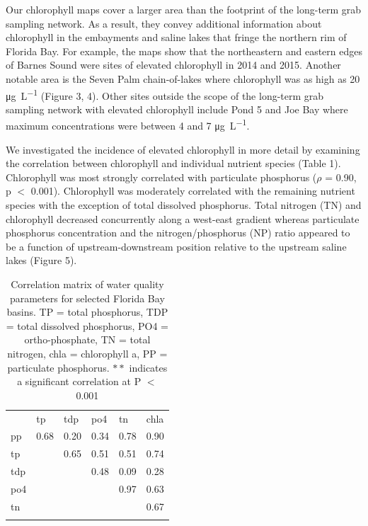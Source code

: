 Our chlorophyll maps cover a larger area than the footprint of the long-term grab sampling network. As a result, they convey additional information about chlorophyll in the embayments and saline lakes that fringe the northern rim of Florida Bay. For example, the maps show that the northeastern and eastern edges of Barnes Sound were sites of elevated chlorophyll in 2014 and 2015. Another notable area is the Seven Palm chain-of-lakes where chlorophyll was as high as 20 \si{\micro\gram\per\liter} (Figure 3, 4). Other sites outside the scope of the long-term grab sampling network with elevated chlorophyll include Pond 5 and Joe Bay where maximum concentrations were between 4 and 7 \si{\micro\gram\per\liter}. 

We investigated the incidence of elevated chlorophyll in more detail by examining the correlation between chlorophyll and individual nutrient species (Table 1). Chlorophyll was most strongly correlated with particulate phosphorus ($\rho$ = 0.90, p $<$ 0.001). Chlorophyll was moderately correlated with the remaining nutrient species with the exception of total dissolved phosphorus. Total nitrogen (TN) and chlorophyll decreased concurrently along a west-east gradient whereas particulate phosphorus concentration and the nitrogen/phosphorus (NP) ratio appeared to be a function of upstream-downstream position relative to the upstream saline lakes (Figure 5).  

\begin{table}
\centering
\caption{Correlation matrix of water quality parameters for selected Florida Bay basins. TP = total phosphorus, TDP = total dissolved phosphorus, PO4 = ortho-phosphate, TN = total nitrogen, chla = chlorophyll a, PP = particulate phosphorus. $**$ indicates a significant correlation at P $<$ 0.001}
\label{tab:1}       %
\begin{tabular}{llllll}
\hline\noalign{\smallskip}
& tp & tdp & po4 & tn & chla \\
\noalign{\smallskip}\hline\noalign{\smallskip}
pp & 0.68 & 0.20 & 0.34 & 0.78 & 0.90 \\ 
tp  &  & 0.65 & 0.51 & 0.51 & 0.74 \\ 
tdp  &  &  & 0.48 & 0.09 & 0.28 \\ 
po4  &  &  &  & 0.97 & 0.63 \\ 
tn  &  &  &  &  & 0.67 \\ 
\noalign{\smallskip}\hline
\end{tabular}
\end{table}

